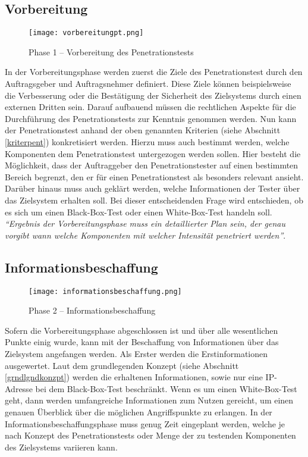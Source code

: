 \subsection{Vorbereitung}

\begin{figure}[h]
	\centering
	\texttt{[image: vorbereitungpt.png]}
	\caption{Phase 1 – Vorbereitung des Penetrationstests}
\end{figure}

In der Vorbereitungsphase werden zuerst die Ziele des Penetrationstest durch den Auftragsgeber und Auftragsnehmer definiert. Diese Ziele können beispielsweise die Verbesserung oder die Bestätigung der Sicherheit des Zielsystems durch einen externen Dritten sein. Darauf aufbauend müssen die rechtlichen Aspekte für die Durchführung des Penetrationstests zur Kenntnis genommen werden. Nun kann der Penetrationstest anhand der oben genannten Kriterien (siehe Abschnitt \ref{kriterpent}) konkretisiert werden. Hierzu muss auch bestimmt werden, welche Komponenten dem Penetrationstest untergezogen werden sollen. Hier besteht die Möglichkeit, dass der Auftraggeber den Penetrationstester auf einen bestimmten Bereich begrenzt, den er für einen Penetrationstest als besonders relevant ansieht. Darüber hinaus muss auch geklärt werden, welche Informationen der Tester über das Zielsystem erhalten soll. Bei dieser entscheidenden Frage wird entschieden, ob es sich um einen Black-Box-Test oder einen White-Box-Test handeln soll. \textit{"`Ergebnis der Vorbereitungsphase muss ein detaillierter Plan sein, der genau vorgibt wann welche Komponenten mit welcher Intensität penetriert werden"'}\cite[100--102]{pt03bsi}.

\subsection{Informationsbeschaffung}
\label{infobeschaffung}

\begin{figure}[h]
	\centering
	\texttt{[image: informationsbeschaffung.png]}
	\caption{Phase 2 – Informationsbeschaffung}
\end{figure}

Sofern die Vorbereitungsphase abgeschlossen ist und über alle wesentlichen Punkte einig wurde, kann mit der Beschaffung von Informationen über das Zielsystem angefangen werden. 
Als Erster werden die Erstinformationen ausgewertet. Laut dem grundlegenden Konzept (siehe Abschnitt \ref{grndlgndkonzpt}) werden die erhaltenen Informationen, sowie nur eine IP-Adresse bei dem Black-Box-Test beschränkt. Wenn es um einen White-Box-Test geht, dann werden umfangreiche Informationen zum Nutzen gereicht, um einen genauen Überblick über die möglichen Angriffspunkte zu erlangen. In der Informationsbeschaffungsphase muss genug Zeit eingeplant werden, welche je nach Konzept des Penetrationstests oder Menge der zu testenden Komponenten des Zielsystems variieren kann\cite[102--103]{pt03bsi}.

